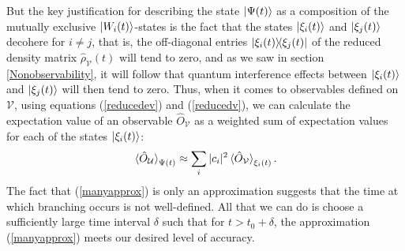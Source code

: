     But the key justification for describing the state $\ket{\Psi(t)}$ as a composition of the mutually exclusive $\ket{W_i(t)}$-states is the fact that the states $\ket{\xi_i(t)}$ and $\ket{\xi_j(t)}$ decohere for $i\neq j$, that is, the off-diagonal entries $\dyad{\xi_i(t)}{\xi_j(t)}$ of the reduced density matrix $\hat{\rho}_\mathcal{V}(t)$ will tend to zero, and as we saw in section \ref{Nonobservability}, it will follow that quantum interference effects between $\ket{\xi_i(t)}$ and $\ket{\xi_j(t)}$ will then tend to zero. Thus, when it comes to observables defined on $\mathcal{V}$, using equations (\ref{reducedev}) and (\ref{reducedv}), we can calculate the expectation value of an observable $\hat{O}_\mathcal{V}$  as a weighted sum of expectation values for each of the states $\ket{\xi_i(t)}$:
    \begin{equation}\label{manyapprox}\ev*{\hat{O}_\mathcal{U}}_{\Psi(t)}\approx\sum_i |c_i|^2 \ev*{\hat{O}_\mathcal{V}}_{\xi_i(t)}.\end{equation}
    The fact that (\ref{manyapprox}) is only an approximation suggests that the time at which branching occurs is not well-defined. All that we can do is choose a  sufficiently large time interval $\delta$ such that for  $t>t_0+\delta$, the approximation (\ref{manyapprox}) meets our desired level of accuracy. 
    
